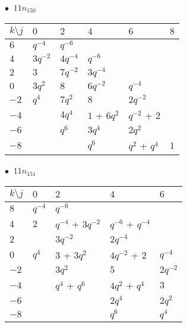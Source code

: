 %
\begin{minipage}{\linewidth}
$\bullet\ $ $11n_{150}$ \vspace{0.5em} \\
\begin{tabular}{l|lllll}
$k \setminus j$ & $0$ & $2$ & $4$ & $6$ & $8$ \\
\hline
$6$ & $q^{-4}$ & $q^{-6}$ &  &  &  \\
$4$ & $3q^{-2}$ & $4q^{-4}$ & $q^{-6}$ &  &  \\
$2$ & $3$ & $7q^{-2}$ & $3q^{-4}$ &  &  \\
$0$ & $3q^{2}$ & $8$ & $6q^{-2}$ & $q^{-4}$ &  \\
$-2$ & $q^{4}$ & $7q^{2}$ & $8$ & $2q^{-2}$ &  \\
$-4$ &  & $4q^{4}$ & $1$ + $6q^{2}$ & $q^{-2}$ + $2$ &  \\
$-6$ &  & $q^{6}$ & $3q^{4}$ & $2q^{2}$ &  \\
$-8$ &  &  & $q^{6}$ & $q^{2}$ + $q^{4}$ & $1$ \\
\end{tabular}
\vspace{2em}
\end{minipage}
%
\begin{minipage}{\linewidth}
$\bullet\ $ $11n_{151}$ \vspace{0.5em} \\
\begin{tabular}{l|llll}
$k \setminus j$ & $0$ & $2$ & $4$ & $6$ \\
\hline
$8$ & $q^{-4}$ & $q^{-6}$ &  &  \\
$4$ & $2$ & $q^{-4}$ + $3q^{-2}$ & $q^{-6}$ + $q^{-4}$ &  \\
$2$ &  & $3q^{-2}$ & $2q^{-4}$ &  \\
$0$ & $q^{4}$ & $3$ + $3q^{2}$ & $4q^{-2}$ + $2$ & $q^{-4}$ \\
$-2$ &  & $3q^{2}$ & $5$ & $2q^{-2}$ \\
$-4$ &  & $q^{4}$ + $q^{6}$ & $4q^{2}$ + $q^{4}$ & $3$ \\
$-6$ &  &  & $2q^{4}$ & $2q^{2}$ \\
$-8$ &  &  & $q^{6}$ & $q^{4}$ \\
\end{tabular}
\vspace{2em}
\end{minipage}
%
